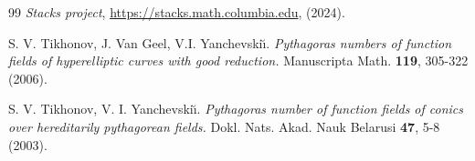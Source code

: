 \begin{thebibliography}{99}
 \textit{Stacks project}, \url{https://stacks.math.columbia.edu}, (2024).

S. V. Tikhonov, J. Van Geel, V.I. Yanchevski\u{\i}. \textit{Pythagoras numbers of function fields of hyperelliptic curves with good reduction.} Manuscripta Math. \textbf{119}, 305-322 (2006).


S. V. Tikhonov, V. I. Yanchevski\u{\i}. \textit{Pythagoras number of function fields of conics over hereditarily pythagorean fields.} Dokl. Nats. Akad. Nauk Belarusi \textbf{47}, 5-8 (2003).








%



\end{thebibliography}
